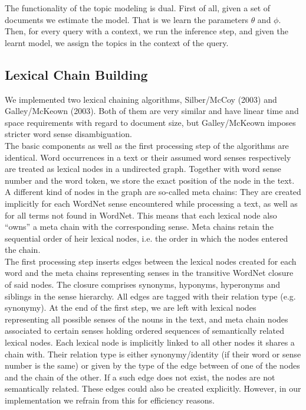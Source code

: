 \documentclass[11pt, a4paper, abstraction]{scrartcl}
\begin{document}
The functionality of the topic modeling is dual. First of all, given a set of documents we estimate the model. That is we  learn the parameters $\theta$ and $\phi$. Then, for every query with a context, we run the inference step, and given the learnt model, we assign the topics in the context of the query. 

\subsection{Lexical Chain Building}

We implemented two lexical chaining algorithms, Silber/McCoy (2003) and Galley/McKeown (2003). Both of them are very similar and have linear time and space requirements with regard to document size, but Galley/McKeown imposes stricter word sense disambiguation. \\
The basic components as well as the first processing step of the algorithms are identical. Word occurrences in a text or their assumed word senses respectively are treated as lexical nodes in a undirected graph. Together with word sense number and the word token, we store the exact position of the node in the text. A different kind of nodes in the graph are so-called meta chains: They are created implicitly for each WordNet sense encountered while processing a text, as well as for all terms not found in WordNet. This means that each lexical node also ``owns'' a meta chain with the corresponding sense. Meta chains retain the sequential order of heir lexical nodes, i.e. the order in which the nodes entered the chain. \\
The first processing step inserts edges between the lexical nodes created for each word and the meta chains representing senses in the transitive WordNet closure of said nodes. The closure comprises synonyms, hyponyms, hyperonyms and siblings in the sense hierarchy. All edges are tagged with their relation type (e.g. synonymy). At the end of the first step, we are left with lexical nodes representing all possible senses of the nouns in the text, and meta chain nodes associated to certain senses holding ordered sequences of semantically related lexical nodes. Each lexical node is implicitly linked to all other nodes it shares a chain with. Their relation type is either synonymy/identity (if their word or sense number is the same) or given by the type of the edge between of one of the nodes and the chain of the other. If a such edge does not exist, the nodes are not semantically related. These edges could also be created explicitly. However, in our implementation we refrain from this for efficiency reasons. \\
\end{document}

